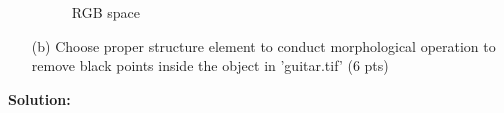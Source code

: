 \documentclass[11pt,letterpaper]{article}
\begin{document}
\begin{itemize}
\begin{figure}[htbp]
\begin{minipage}{0.49\linewidth}
		\caption{RGB space}
	\end{minipage}
\end{figure}
\item[(b)] Choose proper structure element to conduct morphological operation to remove black points inside the object in 'guitar.tif' (6 pts)
\end{itemize}
\textbf{Solution:}
\end{document}
